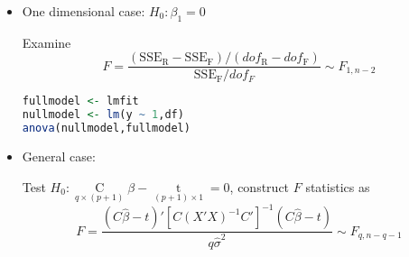 \begin{itemize}[topsep=2pt,itemsep=2pt]
    \begin{itemize}[topsep=2pt,itemsep=2pt]
        \item One dimensional case: $ H_0:\beta _1=0 $
        
        Examine
        \begin{equation}
            F=\dfrac{(\mathrm{SSE_R-SSE_F})/(dof_\mathrm{R}-dof_\mathrm{F} )}{\mathrm{SSE_F}/dof_F} \sim F_{1,n-2}
        \end{equation}
\begin{rcode}
\begin{lstlisting}[language=R]
fullmodel <- lmfit
nullmodel <- lm(y ~ 1,df)
anova(nullmodel,fullmodel)
\end{lstlisting}
\end{rcode}

        \item \hypertarget{HyperlinkGLT}{General case:} Test $ H_0: \mathop{C}\limits_{q\times (p+1)} \beta -\mathop{t}\limits_{(p+1)\times 1} =0 $, construct $ F $ statistics as
        \begin{equation}
            F=\dfrac{ (C\hat{\beta }-t)'\left[C(X'X)^{-1}C'\right]^{-1}(C\hat{\beta }-t)  }{q\hat{\sigma }^2 }\sim F_{q,n-q-1  } 
        \end{equation}
        
        
        


    





    \end{itemize}
    
        







\end{itemize}

